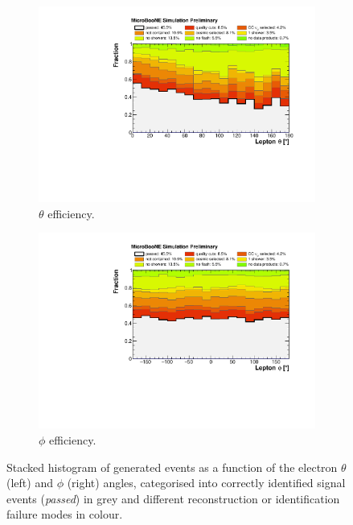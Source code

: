 \begin{figure}
\centering
  \begin{subfigure}{0.48\textwidth}
    \includegraphics[width=\linewidth]{figures/ineff_theta.pdf}
    \caption{$\theta$ efficiency.} 
  \end{subfigure}
    \begin{subfigure}{0.48\textwidth}
    \includegraphics[width=\linewidth]{figures/ineff_phi.pdf}
    \caption{$\phi$ efficiency.} 
  \end{subfigure}
  \caption{Stacked histogram of generated events as a function of the electron $\theta$ (left) and $\phi$ (right) angles, categorised into correctly identified signal events {(\emph{passed})} in grey and different reconstruction or identification failure modes in colour.}
  \label{fig:ineff_angles}
\end{figure}


